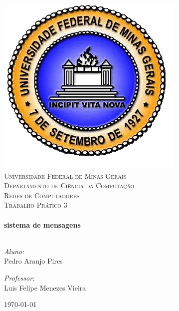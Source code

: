 \begin{titlepage}
\begin{center}

\includegraphics[scale=0.2]{imagens/UFMG.png}\\
\textsc{\LARGE Universidade Federal de Minas Gerais\\
	Departamento de Ciência da Computação}\\[1.5cm]

\textsc{\Large Redes de Computadores\\
	Trabalho Prático 3}\\[0.5cm]

\hrulefill \\[0.4cm]
{ \LARGE \bfseries sistema de mensagens}\\[0.4cm]

\hrulefill \\[1.5cm]
\vspace{7cm}
\begin{minipage}{0.4\textwidth}
\begin{flushleft} \large
\emph{Aluno:}\\
Pedro Araujo Pires \\
\end{flushleft}
\end{minipage}
\begin{minipage}{0.4\textwidth}
\begin{flushright} \large
\emph{Professor:}\\
Luis Felipe Menezes Vieira\\
\end{flushright}
\end{minipage}

\vfill

{\large \today}

\end{center}
\end{titlepage}

